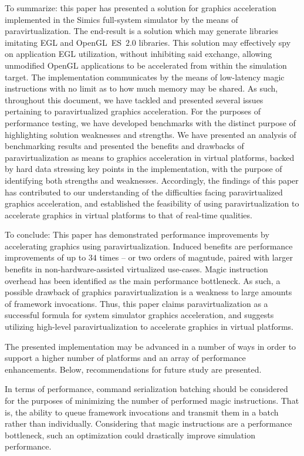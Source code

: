 To summarize: this paper has presented a solution for graphics acceleration implemented in the Simics full-system simulator by the means of paravirtualization.
The end-result is a solution which may generate libraries imitating EGL and OpenGL~ES~$2.0$ libraries.
This solution may effectively spy on application EGL utilization, without inhibiting said exchange, allowing unmodified OpenGL applications to be accelerated from within the simulation target.
The implementation communicates by the means of low-latency magic instructions with no limit as to how much memory may be shared.
As such, throughout this document, we have tackled and presented several issues pertaining to paravirtualized graphics acceleration.
For the purposes of performance testing, we have developed benchmarks with the distinct purpose of highlighting solution weaknesses and strengths.
We have presented an analysis of benchmarking results and presented the benefits and drawbacks of paravirtualization as means to graphics acceleration in virtual platforms, backed by hard data stressing key points in the implementation, with the purpose of identifying both strengths and weaknesses.
Accordingly, the findings of this paper has contributed to our understanding of the difficulties facing paravirtualized graphics acceleration, and established the feasibility of using paravirtualization to accelerate graphics in virtual platforms to that of real-time qualities.

To conclude: This paper has demonstrated performance improvements by accelerating graphics using paravirtualization.
Induced benefits are performance improvements of up to $34$ times -- or two orders of magntude, paired with larger benefits in non-hardware-assisted virtualized use-cases.
Magic instruction overhead has been identified as the main performance bottleneck.
As such, a possible drawback of graphics paravirtualization is a weakness to large amounts of framework invocations.
Thus, this paper claims paravirtualization as a successful formula for system simulator graphics acceleration, and suggests utilizing high-level paravirtualization to accelerate graphics in virtual platforms.

The presented implementation may be advanced in a number of ways in order to support a higher number of platforms and an array of performance enhancements.
Below, recommendations for future study are presented.

In terms of performance, command serialization batching should be considered for the purposes of minimizing the number of performed magic instructions.
That is, the ability to queue framework invocations and transmit them in a batch rather than individually.
Considering that magic instructions are a performance bottleneck, such an optimization could drastically improve simulation performance.

